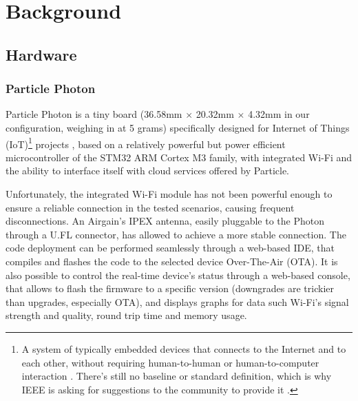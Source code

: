 \chapter{Background}

\section{Hardware}
\subsection{Particle Photon}
Particle Photon is a tiny board (36.58mm $\times$ 20.32mm $\times$ 4.32mm in our configuration, weighing in at 5 grams) specifically designed for Internet of Things (IoT)\footnote{A system of typically embedded devices that connects to the Internet and to each other, without requiring human-to-human or human-to-computer interaction \cite{WikipediaIoT}. There's still no baseline or standard definition, which is why IEEE is asking for suggestions to the community to provide it \cite{IEEEIoT}.} projects \cite{ParticlePhoton}, based on a relatively powerful but power efficient microcontroller of the STM32 ARM Cortex M3 family, with integrated Wi-Fi and the ability to interface itself with cloud services offered by Particle.

Unfortunately, the integrated Wi-Fi module has not been powerful enough to ensure a reliable connection in the tested scenarios, causing frequent disconnections. An Airgain's IPEX antenna, easily pluggable to the Photon through a U.FL connector, has allowed to achieve a more stable connection.
The code deployment can be performed seamlessly through a web-based IDE, that compiles and flashes the code to the selected device Over-The-Air (OTA). It is also possible to control the real-time device's status through a web-based console, that allows to flash the firmware to a specific version (downgrades are trickier than upgrades, especially OTA), and displays graphs for data such Wi-Fi's signal strength and quality, round trip time and memory usage.

